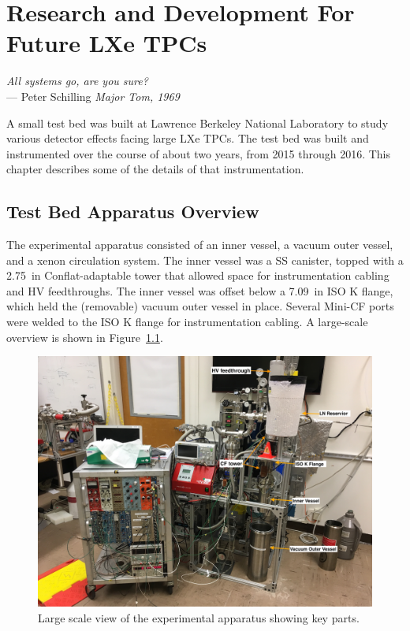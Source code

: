 \chapter{Research and Development For Future LXe TPCs}

\label{ch:testbed} %

\begin{flushright}{\slshape    
  All systems go, are you sure? } \\ \medskip
    --- {Peter Schilling \textit{Major Tom, 1969}}
\end{flushright}


A small test bed was built at Lawrence Berkeley National Laboratory to study various detector effects facing large \ac{LXe} \ac{TPC}s. The test bed was built and instrumented over the course of about two years, from 2015 through 2016. This chapter describes some of the details of that instrumentation.

\section{Test Bed Apparatus Overview}
The experimental apparatus consisted of an inner vessel, a vacuum outer vessel, and a xenon circulation system. The inner vessel was a \ac{SS} canister, topped with a 2.75~in Conflat-adaptable tower that allowed space for instrumentation cabling and \ac{HV} feedthroughs. The inner vessel was offset below a 7.09~in ISO K flange, which held the (removable) vacuum outer vessel in place. Several Mini-CF ports were welded to the ISO K flange for instrumentation cabling. A large-scale overview is shown in Figure~\ref{fig:apparatus}.

\begin{figure}[htbp]
\begin{center}
\includegraphics[width=\textwidth]{figures/testbed/apparatus.jpg}
\caption{Large scale view of the experimental apparatus showing key parts.}
\label{fig:apparatus}
\end{center}
\end{figure}

